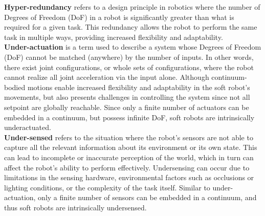 \noindent \textbf{Hyper-redundancy}  refers to a design principle in robotics where the number of Degrees of Freedom (DoF) in a robot is significantly greater than what is required for a given task. This redundancy allows the robot to perform the same task in multiple ways, providing increased flexibility and adaptability.
\\

\noindent \textbf{Under-actuation} is a term used to describe a system whose Degrees of Freedom (DoF) cannot be matched (anywhere) by the number of inputs. In other words, there exist joint configurations, or whole sets of configurations, where the robot cannot realize all joint acceleration via the input alone. Although continuum-bodied motions enable increased flexibility and adaptability in the soft robot's movements, but also presents challenges in controlling the system since not all setpoint are globally reachable. Since only a finite number of actuators can be embedded in a continuum, but possess infinite DoF, soft robots are intrinsically underactuated. \\

\noindent \textbf{Under-sensed} refers to the situation where the robot's sensors are not able to capture all the relevant information about its environment or its own state. This can lead to incomplete or inaccurate perception of the world, which in turn can affect the robot's ability to perform effectively. Undersensing can occur due to limitations in the sensing hardware, environmental factors such as occlusions or lighting conditions, or the complexity of the task itself. Similar to under-actuation, only a finite number of sensors can be embedded in a continuum, and thus soft robots are intrinsically undersensed. \\
